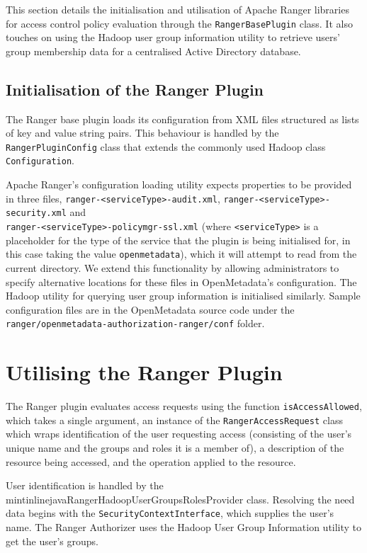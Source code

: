 This section details the initialisation and utilisation of Apache Ranger libraries for access control policy evaluation through the \texttt{RangerBasePlugin} class. It also touches on using the Hadoop user group information utility to retrieve users' group membership data for a centralised Active Directory database.

\subsection{Initialisation of the Ranger Plugin}

The Ranger base plugin loads its configuration from XML files structured as lists of key and value string pairs. This behaviour is handled by the \texttt{RangerPluginConfig} class that extends the commonly used Hadoop class \texttt{Configuration}.

Apache Ranger's configuration loading utility expects properties to be provided in three files, \texttt{ranger-<serviceType>-audit.xml}, \texttt{ranger-<serviceType>-security.xml} and\\ \texttt{ranger-<serviceType>-policymgr-ssl.xml} (where \texttt{<serviceType>} is a placeholder for the type of the service that the plugin is being initialised for, in this case taking the value \texttt{openmetadata}), which it will attempt to read from the current directory. We extend this functionality by allowing administrators to specify alternative locations for these files in OpenMetadata's configuration. The Hadoop utility for querying user group information is initialised similarly. Sample configuration files are in the OpenMetadata source code under the \texttt{ranger/openmetadata-authorization-ranger/conf} folder.

\section{Utilising the Ranger Plugin}

The Ranger plugin evaluates access requests using the function \texttt{isAccessAllowed}, which takes a single argument, an instance of the \texttt{RangerAccessRequest} class which wraps identification of the user requesting access (consisting of the user's unique name and the groups and roles it is a member of), a description of the resource being accessed, and the operation applied to the resource. 

User identification is handled by the mintinline{java}{RangerHadoopUserGroupsRolesProvider} class. Resolving the need data begins with the \texttt{SecurityContextInterface}, which supplies the user's name. The Ranger Authorizer uses the Hadoop User Group Information utility to get the user's groups.

